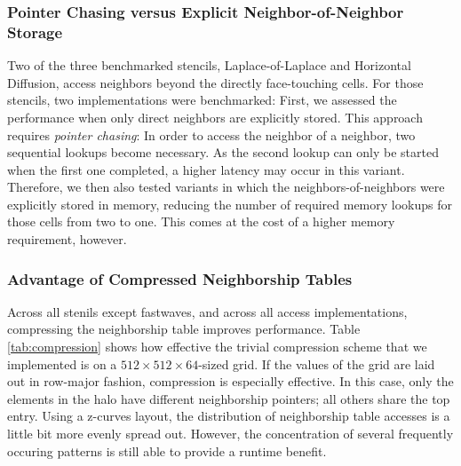 
\subsubsection{Pointer Chasing versus Explicit Neighbor-of-Neighbor Storage}

Two of the three benchmarked stencils, Laplace-of-Laplace and Horizontal Diffusion, access neighbors beyond the directly face-touching cells. For those stencils, two implementations were benchmarked: First, we assessed the performance when only direct neighbors are explicitly stored. This approach requires \emph{pointer chasing}: In order to access the neighbor of a neighbor, two sequential lookups become necessary. As the second lookup can only be started when the first one completed, a higher latency may occur in this variant. Therefore, we then also tested variants in which the neighbors-of-neighbors were explicitly stored in memory, reducing the number of required memory lookups for those cells from two to one. This comes at the cost of a higher memory requirement, however.



\subsubsection{Advantage of Compressed Neighborship Tables}

Across all stenils except fastwaves, and across all access implementations, compressing the neighborship table improves performance. Table \ref{tab:compression} shows how effective the trivial compression scheme that we implemented is on a $512\times 512\times 64$-sized grid. If the values of the grid are laid out in row-major fashion, compression is especially effective. In this case, only the elements in the halo have different neighborship pointers; all others share the top entry. Using a z-curves layout, the distribution of neighborship table accesses is a little bit more evenly spread out. However, the concentration of several frequently occuring patterns is still able to provide a runtime benefit.

